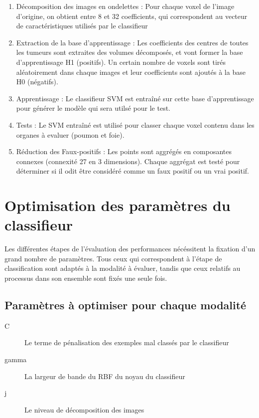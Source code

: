 \begin{enumerate}
 \item Décomposition des images en ondelettes : Pour chaque voxel de l'image d'origine, on obtient entre 8 et 32 coefficients, qui correspondent au vecteur de caractéristiques utilisés par le classifieur
 \item Extraction de la base d'apprentissage : Les coefficients des centres de toutes les tumeurs sont extraites des volumes décomposés, et vont former la base d'apprentissage H1 (positifs). Un certain nombre de voxels sont tirés aléatoirement dans chaque images et leur coefficients sont ajoutés à la base H0 (négatifs).
 \item Apprentissage : Le classifieur SVM est entraîné sur cette base d'apprentissage pour générer le modèle qui sera utilsé pour le test.
 \item Tests : Le SVM entraîné est utilisé pour classer chaque voxel contenu dans les organes à evaluer (poumon et foie).
 \item Réduction des Faux-positifs : Les points sont aggrégés en composantes connexes (connexité 27 en 3 dimensions). Chaque aggrégat est testé pour déterminer si il odit être considéré comme un faux positif ou un vrai positif.
\end{enumerate}

\section{Optimisation des paramètres du classifieur}
\label{lab:optim}

Les différentes étapes de l'évaluation des performances nécéssitent la fixation d'un grand nombre de paramètres. Tous ceux qui correspondent à l'étape de classification sont adaptés à la modalité à évaluer, tandis que ceux relatifs au processus dans son ensemble sont fixés une seule fois.

\subsection{Paramètres à optimiser pour chaque modalité}

\begin{description}
 \item[C] Le terme de pénalisation des exemples mal classés par le classifieur
 \item[gamma] La largeur de bande du RBF du noyau du classifieur
 \item[j] Le niveau de décomposition des images 
\end{description}

